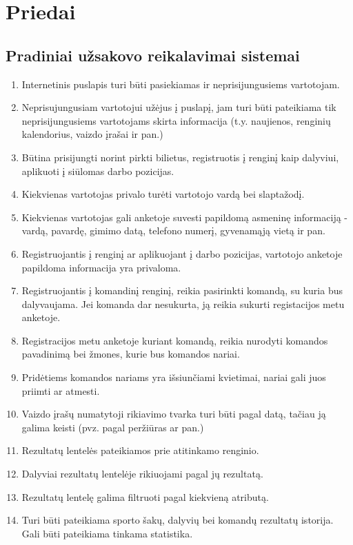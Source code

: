 \documentclass{VUMIFPSkursinis}
\begin{document}
    \section{Priedai}\label{priedai}
        \subsection{Pradiniai užsakovo reikalavimai sistemai}
		\begin{enumerate}
			\item Internetinis puslapis turi būti pasiekiamas ir neprisijungusiems vartotojam.
			\item Neprisujungusiam vartotojui užėjus į puslapį, jam turi būti pateikiama tik neprisijungusiems vartotojams skirta informacija (t.y. naujienos, renginių kalendorius, vaizdo įrašai ir pan.)
			\item Būtina prisijungti norint pirkti bilietus, registruotis į renginį kaip dalyviui, aplikuoti į siūlomas darbo pozicijas.
			\item Kiekvienas vartotojas privalo turėti vartotojo vardą bei slaptažodį.
			\item Kiekvienas vartotojas gali anketoje suvesti papildomą asmeninę informaciją - vardą, pavardę, gimimo datą, telefono numerį, gyvenamąją vietą ir pan.
			\item Registruojantis į renginį ar aplikuojant į darbo pozicijas, vartotojo anketoje papildoma informacija yra privaloma.
			\item Registruojantis į komandinį renginį, reikia pasirinkti komandą, su kuria bus dalyvaujama. Jei komanda dar nesukurta, ją reikia sukurti registacijos metu anketoje.
			\item Registracijos metu anketoje kuriant komandą, reikia nurodyti komandos pavadinimą bei žmones, kurie bus komandos nariai.
			\item Pridėtiems komandos nariams yra išsiunčiami kvietimai, nariai gali juos priimti ar atmesti.
			\item Vaizdo įrašų numatytoji rikiavimo tvarka turi būti pagal datą, tačiau ją galima keisti (pvz. pagal peržiūras ar pan.)
			\item Rezultatų lentelės pateikiamos prie atitinkamo renginio.
			\item Dalyviai rezultatų lentelėje rikiuojami pagal jų rezultatą.
			\item Rezultatų lentelę galima filtruoti pagal kiekvieną atributą.
			\item Turi būti pateikiama sporto šakų, dalyvių bei komandų rezultatų istorija. Gali būti pateikiama tinkama statistika.

\end{enumerate}
\end{document}
